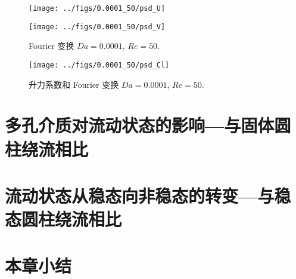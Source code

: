 \begin{figure}
	\centering
	\begin{minipage}{\textwidth}
		\centering
		\texttt{[image: ../figs/0.0001\_50/psd\_U]}
	\end{minipage}
	\centering
	\begin{minipage}{\textwidth}
		\centering
		\texttt{[image: ../figs/0.0001\_50/psd\_V]}
	\end{minipage}
	\caption{Fourier 变换 $Da=0.0001$, $Re=50$.}
\end{figure}

\begin{figure}
	\centering
	\texttt{[image: ../figs/0.0001\_50/psd\_Cl]}
	\caption{升力系数和 Fourier 变换 $Da=0.0001$, $Re=50$.}
\end{figure}

\section{多孔介质对流动状态的影响---与固体圆柱绕流相比}

\section{流动状态从稳态向非稳态的转变---与稳态圆柱绕流相比}

\section{本章小结}
